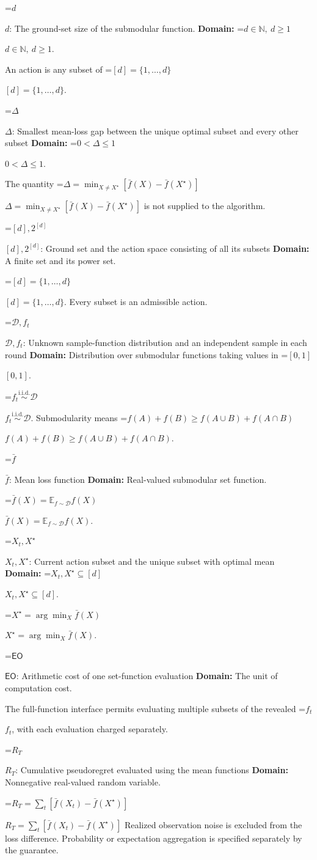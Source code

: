 \documentclass[10pt,a4paper]{article}
\newcommand{\AtlasMath}[1]{\par\begingroup\centering\setbox0=\hbox{$\displaystyle #1$}\ifdim\wd0>1.4\linewidth\typeout{ATLAS WIDE FORMULA: \the\wd0}\fi\ifdim\wd0>\linewidth\resizebox{\linewidth}{!}{\box0}\else\box0\fi\par\endgroup}
\newcommand{\AtlasInlineMath}[1]{\begingroup\setbox0=\hbox{$#1$}\ifdim\wd0>.4\linewidth\endgroup\AtlasMath{#1}\else\endgroup$#1$\fi}
\begin{document}
\AtlasInlineMath{d}: The ground-set size of the submodular function. \textbf{Domain:} \AtlasInlineMath{d\in\mathbb N,\ d\ge1}.

An action is any subset of \AtlasInlineMath{[d]=\{1,\ldots,d\}}.

\AtlasInlineMath{\Delta}: Smallest mean-loss gap between the unique optimal subset and every other subset \textbf{Domain:} \AtlasInlineMath{0<\Delta\le1}.

The quantity \AtlasInlineMath{\Delta=\min_{X\ne X^\star}[\bar f(X)-\bar f(X^\star)]} is not supplied to the algorithm.

\AtlasInlineMath{[d],2^{[d]}}: Ground set and the action space consisting of all its subsets \textbf{Domain:} A finite set and its power set.

\AtlasInlineMath{[d]=\{1,\ldots,d\}}. Every subset is an admissible action.

\AtlasInlineMath{\mathcal D,f_t}: Unknown sample-function distribution and an independent sample in each round \textbf{Domain:} Distribution over submodular functions taking values in \AtlasInlineMath{[0,1]}.

\AtlasInlineMath{f_t\overset{\mathrm{i.i.d.}}\sim\mathcal D}. Submodularity means \AtlasInlineMath{f(A)+f(B)\ge f(A\cup B)+f(A\cap B)}.

\AtlasInlineMath{\bar f}: Mean loss function \textbf{Domain:} Real-valued submodular set function.

\AtlasInlineMath{\bar f(X)=\mathbb E_{f\sim\mathcal D}f(X)}.

\AtlasInlineMath{X_t,X^\star}: Current action subset and the unique subset with optimal mean \textbf{Domain:} \AtlasInlineMath{X_t,X^\star\subseteq[d]}.

\AtlasInlineMath{X^\star=\arg\min_X\bar f(X)}.

\AtlasInlineMath{\mathsf{EO}}: Arithmetic cost of one set-function evaluation \textbf{Domain:} The unit of computation cost.

The full-function interface permits evaluating multiple subsets of the revealed \AtlasInlineMath{f_t}, with each evaluation charged separately.

\AtlasInlineMath{R_T}: Cumulative pseudoregret evaluated using the mean functions \textbf{Domain:} Nonnegative real-valued random variable.

\AtlasInlineMath{R_T=\sum_t[\bar f(X_t)-\bar f(X^\star)]} Realized observation noise is excluded from the loss difference. Probability or expectation aggregation is specified separately by the guarantee.
\end{document}

